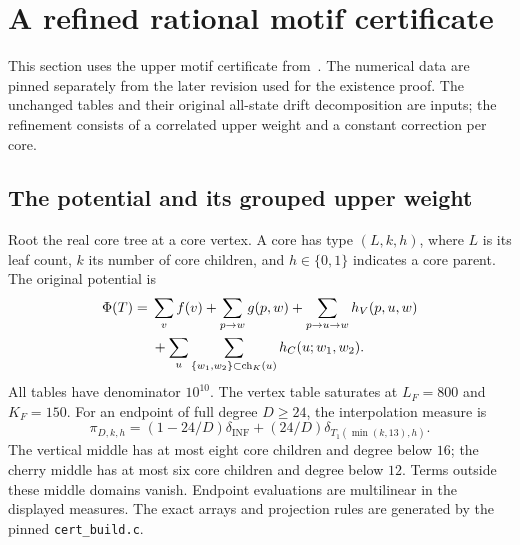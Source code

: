 \section{A refined rational motif certificate}
\label{numerical:section}

This section uses the upper motif certificate from~\cite{UzayTables}.
The numerical data are pinned separately from the later revision used
for the existence proof. The unchanged tables and their original
all-state drift decomposition are inputs; the refinement consists of
a correlated upper weight and a constant correction per core.

\subsection{The potential and its grouped upper weight}

Root the real core tree at a core vertex. A core has type $(L,k,h)$,
where $L$ is its leaf count, $k$ its number of core children, and
$h\in\{0,1\}$ indicates a core parent. The original potential is
\begin{align}\label{num:potential}
 \Phi(T)={}&\sum_v f(v)+\sum_{p\to w}g(p,w)
       +\sum_{p\to u\to w}h_V(p,u,w)\notag\\
       &+\sum_u\sum_{\{w_1,w_2\}\subset\operatorname{ch}_K(u)}
                       h_C(u;w_1,w_2).
\end{align}
All tables have denominator $10^{10}$. The vertex table saturates at
$L_F=800$ and $K_F=150$. For an endpoint of full degree $D\ge24$,
the interpolation measure is
\[
 \pi_{D,k,h}=(1-24/D)\delta_{\mathrm{INF}}
       +(24/D)\delta_{T_1(\min(k,13),h)}.
\]
The vertical middle has at most eight core children and degree below
$16$; the cherry middle has at most six core children and degree below
$12$. Terms outside these middle domains vanish. Endpoint evaluations
are multilinear in the displayed measures. The exact arrays and
projection rules are generated by the pinned \texttt{cert\_build.c}.

